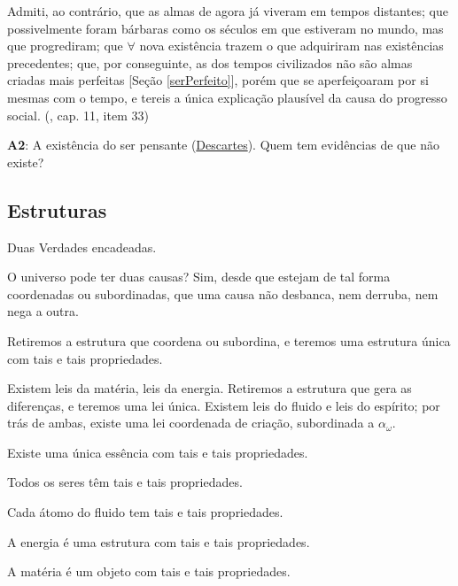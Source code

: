 \documentclass[12pt,a4paper]{article}
\begin{document}
			Admiti, ao contr\'ario, que as almas de agora j\'a viveram em tempos distantes; que possivelmente foram b\'arbaras como os s\'eculos em que estiveram no mundo, mas que progrediram; que $\forall$ nova exist\^encia trazem o que adquiriram nas exist\^encias precedentes; que, por conseguinte, as dos tempos civilizados n\~ao s\~ao almas criadas mais perfeitas [Se\c{c}\~ao \ref{serPerfeito}], por\'em que se aperfei\c{c}oaram por si mesmas com o tempo, e tereis a \'unica explica\c{c}\~ao plaus\'ivel da causa do progresso social\cite{social}. (\cite{genese}, cap. 11, item 33)

			\begin{flushright}
			\end{flushright}

            \textbf{A2}: A exist\^encia do ser pensante (\href{http://pt.wikipedia.org/wiki/Ren\%C3\%A9_Descartes}{Descartes}). Quem tem evid\^encias\cite{evidencias} de que n\~ao existe?

		\subsection{Estruturas}\label{estruturas}

			\begin{flushright}
			\end{flushright}

			Duas Verdades encadeadas.

			O universo pode ter duas causas? Sim, desde que estejam de tal forma coordenadas ou subordinadas, que uma causa n\~ao desbanca, nem derruba, nem nega a outra.

			Retiremos a estrutura que coordena ou subordina, e teremos uma estrutura \'unica com tais e tais propriedades.

			Existem leis da mat\'eria, leis da energia. Retiremos a estrutura que gera as diferen\c{c}as, e teremos uma lei \'unica. Existem leis do fluido e leis do esp\'irito; por tr\'as de ambas, existe uma lei coordenada de cria\c{c}\~ao, subordinada a $ \alpha_\omega $.

			Existe uma \'unica ess\^encia com tais e tais propriedades.

			Todos os seres t\^em tais e tais propriedades.

			Cada \'atomo do fluido tem tais e tais propriedades.

			A energia \'e uma estrutura com tais e tais propriedades.

			A mat\'eria \'e um objeto com tais e tais propriedades.
\end{document}
